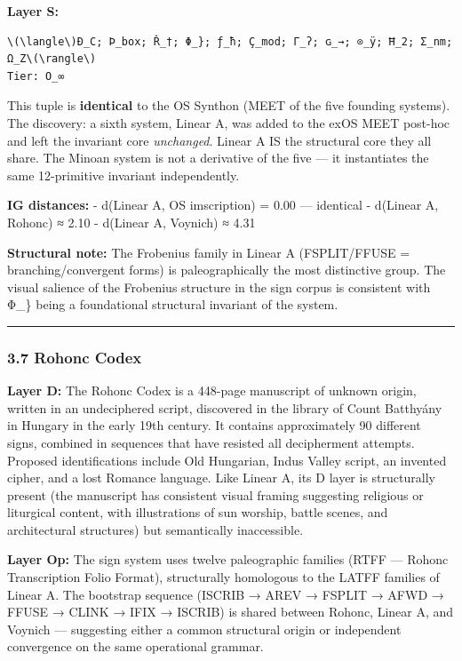 \documentclass[
  11pt,
  a4paper,
]{article}
\begin{document}
\textbf{Layer S:}

\begin{verbatim}
\(\langle\)Ð_C; Þ_box; Ř_†; Φ_}; ƒ_ħ; Ç_mod; Γ_ʔ; ɢ_→; ⊙_ÿ; Ħ_2; Σ_nm; Ω_Z\(\rangle\)
Tier: O_∞
\end{verbatim}

This tuple is \textbf{identical} to the OS Synthon (MEET of the five
founding systems). The discovery: a sixth system, Linear A, was added to
the exOS MEET post-hoc and left the invariant core \emph{unchanged}.
Linear A IS the structural core they all share. The Minoan system is not
a derivative of the five --- it instantiates the same 12-primitive
invariant independently.

\textbf{IG distances:} - d(Linear A, OS imscription) = 0.00 ---
identical - d(Linear A, Rohonc) ≈ 2.10 - d(Linear A, Voynich) ≈ 4.31

\textbf{Structural note:} The Frobenius family in Linear A (FSPLIT/FFUSE
= branching/convergent forms) is paleographically the most distinctive
group. The visual salience of the Frobenius structure in the sign corpus
is consistent with Φ\_\} being a foundational structural invariant of
the system.

\begin{center}\rule{0.5\linewidth}{0.5pt}\end{center}

\subsubsection{3.7 Rohonc Codex}\label{rohonc-codex}

\textbf{Layer D:} The Rohonc Codex is a 448-page manuscript of unknown
origin, written in an undeciphered script, discovered in the library of
Count Batthyány in Hungary in the early 19th century. It contains
approximately 90 different signs, combined in sequences that have
resisted all decipherment attempts. Proposed identifications include Old
Hungarian, Indus Valley script, an invented cipher, and a lost Romance
language. Like Linear A, its D layer is structurally present (the
manuscript has consistent visual framing suggesting religious or
liturgical content, with illustrations of sun worship, battle scenes,
and architectural structures) but semantically inaccessible.

\textbf{Layer Op:} The sign system uses twelve paleographic families
(RTFF --- Rohonc Transcription Folio Format), structurally homologous to
the LATFF families of Linear A. The bootstrap sequence (ISCRIB → AREV →
FSPLIT → AFWD → FFUSE → CLINK → IFIX → ISCRIB) is shared between Rohonc,
Linear A, and Voynich --- suggesting either a common structural origin
or independent convergence on the same operational grammar.
\end{document}
